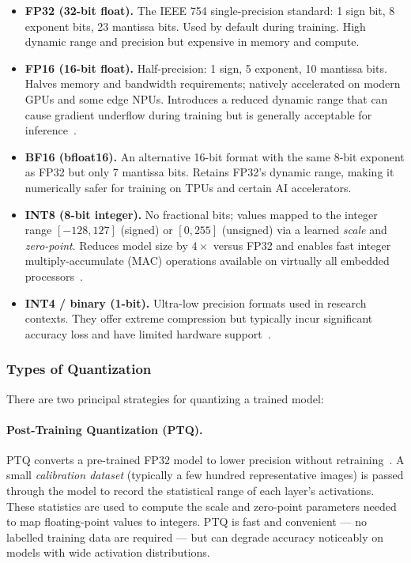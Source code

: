 \begin{itemize}
    \item \textbf{FP32 (32-bit float).} The IEEE 754 single-precision
          standard: 1 sign bit, 8 exponent bits, 23 mantissa bits.
          Used by default during training. High dynamic range and
          precision but expensive in memory and compute.
 
    \item \textbf{FP16 (16-bit float).} Half-precision: 1 sign,
          5 exponent, 10 mantissa bits. Halves memory and bandwidth
          requirements; natively accelerated on modern GPUs and some
          edge NPUs. Introduces a reduced dynamic range that can cause
          gradient underflow during training but is generally
          acceptable for inference~\cite{micikevicius2018mixed}.
 
    \item \textbf{BF16 (bfloat16).} An alternative 16-bit format with
          the same 8-bit exponent as FP32 but only 7 mantissa bits.
          Retains FP32's dynamic range, making it numerically safer
          for training on TPUs and certain AI accelerators.
 
    \item \textbf{INT8 (8-bit integer).} No fractional bits; values
          mapped to the integer range $[-128, 127]$ (signed) or
          $[0, 255]$ (unsigned) via a learned \emph{scale} and
          \emph{zero-point}. Reduces model size by $4\times$ versus
          FP32 and enables fast integer multiply-accumulate (MAC)
          operations available on virtually all embedded
          processors~\cite{jacob2018quantization}.
 
    \item \textbf{INT4 / binary (1-bit).} Ultra-low precision formats
          used in research contexts. They offer extreme compression
          but typically incur significant accuracy loss and have
          limited hardware support~\cite{hubara2017quantized}.
\end{itemize}
 
\subsubsection{Types of Quantization}
 
There are two principal strategies for quantizing a trained model:
 
\paragraph{Post-Training Quantization (PTQ).}
PTQ converts a pre-trained FP32 model to lower precision without
retraining~\cite{nagel2020up}. A small \emph{calibration dataset}
(typically a few hundred representative images) is passed through
the model to record the statistical range of each layer's activations.
These statistics are used to compute the scale and zero-point
parameters needed to map floating-point values to integers. PTQ
is fast and convenient — no labelled training data are required —
but can degrade accuracy noticeably on models with wide activation
distributions.
 
